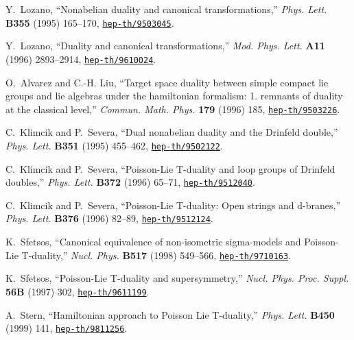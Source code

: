 \documentclass[a4paper,12pt]{article}
\begin{document}
\begin{thebibliography}{10}
Y.~Lozano, ``Nonabelian duality and canonical transformations,'' {\em Phys.
  Lett.} {\bf B355} (1995) 165--170,
\href{http://www.arXiv.org/abs/hep-th/9503045}{{\tt hep-th/9503045}}.

Y.~Lozano, ``Duality and canonical transformations,'' {\em Mod. Phys. Lett.}
  {\bf A11} (1996) 2893--2914,
\href{http://www.arXiv.org/abs/hep-th/9610024}{{\tt hep-th/9610024}}.

O.~Alvarez and C.-H. Liu, ``Target space duality between simple compact lie
  groups and lie algebras under the hamiltonian formalism: 1. remnants of
  duality at the classical level,'' {\em Commun. Math. Phys.} {\bf 179} (1996)
  185,
\href{http://www.arXiv.org/abs/hep-th/9503226}{{\tt hep-th/9503226}}.

C.~Klimcik and P.~Severa, ``Dual nonabelian duality and the {Drinfeld}
  double,'' {\em Phys. Lett.} {\bf B351} (1995) 455--462,
\href{http://www.arXiv.org/abs/hep-th/9502122}{{\tt hep-th/9502122}}.

C.~Klimcik and P.~Severa, ``Poisson-{Lie} {T}-duality and loop groups of
  {Drinfeld} doubles,'' {\em Phys. Lett.} {\bf B372} (1996) 65--71,
\href{http://www.arXiv.org/abs/hep-th/9512040}{{\tt hep-th/9512040}}.

C.~Klimcik and P.~Severa, ``Poisson-{Lie} {T}-duality: Open strings and
  d-branes,'' {\em Phys. Lett.} {\bf B376} (1996) 82--89,
\href{http://www.arXiv.org/abs/hep-th/9512124}{{\tt hep-th/9512124}}.

K.~Sfetsos, ``Canonical equivalence of non-isometric sigma-models and
  {Poisson-Lie} {T}-duality,'' {\em Nucl. Phys.} {\bf B517} (1998) 549--566,
\href{http://www.arXiv.org/abs/hep-th/9710163}{{\tt hep-th/9710163}}.

K.~Sfetsos, ``{Poisson-Lie} {T}-duality and supersymmetry,'' {\em Nucl. Phys.
  Proc. Suppl.} {\bf 56B} (1997) 302,
\href{http://www.arXiv.org/abs/hep-th/9611199}{{\tt hep-th/9611199}}.

A.~Stern, ``Hamiltonian approach to {Poisson} {Lie} {T}-duality,'' {\em Phys.
  Lett.} {\bf B450} (1999) 141,
\href{http://www.arXiv.org/abs/hep-th/9811256}{{\tt hep-th/9811256}}.


\end{thebibliography}
\end{document}
